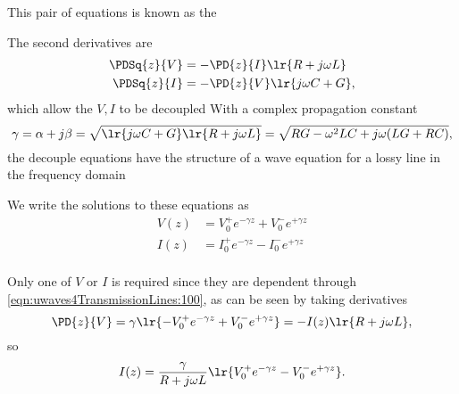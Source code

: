 This pair of equations is known as the 

The second derivatives are
\begin{equation}\label{eqn:uwaves4TransmissionLines:120}
\begin{aligned}
\PDSq{z}{V} &= -\PD{z}{I} \lr{ R + j \omega L } \\
\PDSq{z}{I} &= -\PD{z}{V} \lr{ j \omega C + G},
\end{aligned}
\end{equation}
which allow the \( V, I \) to be decoupled
With a complex propagation constant
\begin{dmath}\label{eqn:uwaves4TransmissionLines:160}
\gamma
= \alpha + j \beta
= \sqrt{ \lr{ j \omega C + G} \lr{ R + j \omega L } }
=
\sqrt{ R G - \omega^2 L C + j \omega ( L G + R C ) },
\end{dmath}
the decouple equations have the structure of a wave equation for a lossy line in the frequency domain

We write the solutions to these equations as
\begin{equation}\label{eqn:uwaves4TransmissionLines:200}
\begin{aligned}
V(z) &= V_0^{+} e^{-\gamma z} + V_0^{-} e^{+\gamma z} \\
I(z) &= I_0^{+} e^{-\gamma z} - I_0^{-} e^{+\gamma z} \\
\end{aligned}
\end{equation}

Only one of \( V \) or \( I \) is required since they are dependent through \cref{eqn:uwaves4TransmissionLines:100}, as can be seen by taking derivatives
\begin{dmath}\label{eqn:uwaves4TransmissionLines:220}
\PD{z}{V}
= \gamma \lr{ -V_0^{+} e^{-\gamma z} + V_0^{-} e^{+\gamma z} }
=
-I(z) \lr{ R + j \omega L },
\end{dmath}
so
\begin{equation}\label{eqn:uwaves4TransmissionLines:240}
I(z)
=
\frac{\gamma}{ R + j \omega L } \lr{ V_0^{+} e^{-\gamma z} - V_0^{-} e^{+\gamma z} }.
\end{equation}


